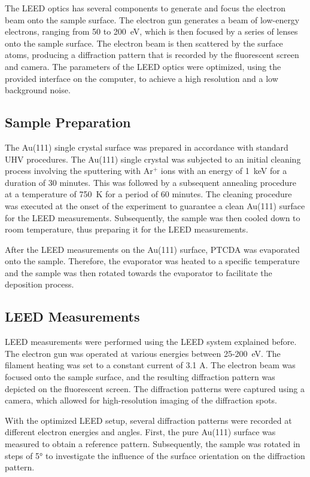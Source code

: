 \documentclass[fontsize=11pt,reqno,a4paper,oneside]{scrartcl}
\begin{document}
The \ac{LEED} optics has several components to generate and focus the electron beam onto the sample surface. The electron gun generates a beam of low-energy electrons, ranging from 50 to 200~\si{eV}, which is then focused by a series of lenses onto the sample surface. The electron beam is then scattered by the surface atoms, producing a diffraction pattern that is recorded by the fluorescent screen and camera. The parameters of the \ac{LEED} optics were optimized, using the provided interface on the computer, to achieve a high resolution and a low background noise.

\subsection{Sample Preparation}

The Au(111) single crystal surface was prepared in accordance with standard \ac{UHV} procedures. The Au(111) single crystal was subjected to an initial cleaning process involving the sputtering with Ar$^+$ ions with an energy of 1~\si{keV} for a duration of 30 minutes. This was followed by a subsequent annealing procedure at a temperature of 750~\si{K} for a period of 60 minutes. The cleaning procedure was executed at the onset of the experiment to guarantee a clean Au(111) surface for the \ac{LEED} measurements. Subsequently, the sample was then cooled down to room temperature, thus preparing it for the \ac{LEED} measurements.

After the \ac{LEED} measurements on the Au(111) surface, \ac{PTCDA} was evaporated onto the sample. Therefore, the evaporator was heated to a specific temperature and the sample was then rotated towards the evaporator to facilitate the deposition process.

\subsection{LEED Measurements}

\Ac{LEED} measurements were performed using the \ac{LEED} system explained before. The electron gun was operated at various energies between 25-200~\si{eV}. The filament heating was set to a constant current of 3.1 A. The electron beam was focused onto the sample surface, and the resulting diffraction pattern was depicted on the fluorescent screen. The diffraction patterns were captured using a camera, which allowed for high-resolution imaging of the diffraction spots.

With the optimized \ac{LEED} setup, several diffraction patterns were recorded at different electron energies and angles. First, the pure Au(111) surface was measured to obtain a reference pattern. Subsequently, the sample was rotated in steps of 5° to investigate the influence of the surface orientation on the diffraction pattern.
\end{document}
